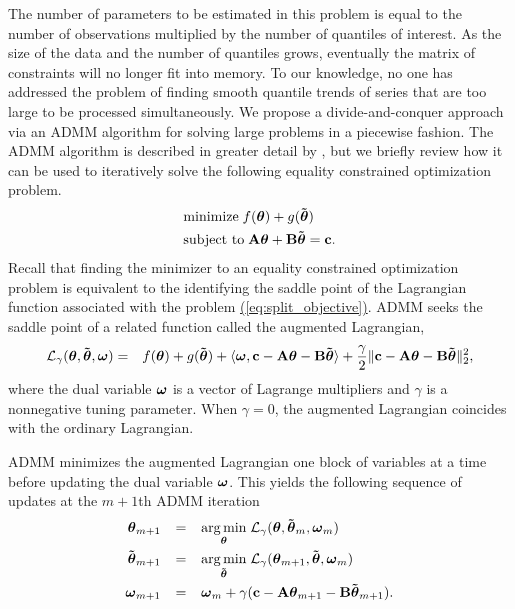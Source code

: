 \documentclass[12pt]{article}
\newcommand{\Eqn}[1]{\hyperref[eq:#1]{{\rm (\ref*{eq:#1})}}} %
\newcommand{\Eqn}[1]{{(\ref{eq:#1})}} %
\newcommand{\amp}{\mathop{\:\:\,}\nolimits}
\newcommand{\V}[1]{{\bm{\mathbf{\MakeLowercase{#1}}}}} %
\newcommand{\Vtilde}[1]{{\bm{\tilde \mathbf{\MakeLowercase{#1}}}}} %
\newcommand{\M}[1]{{\bm{\mathbf{\MakeUppercase{#1}}}}} %
\begin{document}
The number of parameters to be estimated in this problem is equal to the number of observations multiplied by the number of quantiles of interest. As the size of the data and the number of quantiles grows, eventually the matrix of constraints will no longer fit into memory. To our knowledge, no one has addressed the problem of finding smooth quantile trends of series that are too large to be processed simultaneously. We propose a divide-and-conquer approach via an ADMM algorithm for solving large problems in a piecewise fashion. The ADMM algorithm \citep{gabay1975dual, glowinski1975approximation} is  described in greater detail by \cite{boyd2011distributed}, but we briefly review how it can be used to iteratively solve the following equality constrained optimization problem.
\begin{equation}
\label{eq:split_objective}
\begin{split}
&\text{minimize} \; f(\V{\theta}) + g(\Vtilde{\theta}) \\
&\text{subject to} \; \M{A}\V{\theta} + \M{B}\Vtilde{\theta} = \V{c}.
\end{split}
\end{equation}
Recall that finding the minimizer to an equality constrained optimization problem is equivalent to the identifying the saddle point of the Lagrangian function associated with the problem \Eqn{split_objective}. ADMM seeks the saddle point of a related function called the augmented Lagrangian,
\begin{eqnarray*}
\mathcal{L}_{\gamma}(\V{\theta},\Vtilde{\theta},\V{\omega}) & = & f(\V{\theta}) + g(\Vtilde{\theta}) + \langle \V{\omega}, \V{c} - \M{A}\V{\theta} - \M{B}\Vtilde{\theta} \rangle
+ \frac{\gamma}{2} \lVert \V{c} - \M{A}\V{\theta} - \M{B}\Vtilde{\theta} \rVert_2^2,
\end{eqnarray*}
where the dual variable $\V{\omega}$ is a vector of Lagrange multipliers and $\gamma$ is a nonnegative tuning parameter. When $\gamma = 0$, the augmented Lagrangian coincides with the ordinary Lagrangian.

ADMM minimizes the augmented Lagrangian one block of variables at a time before updating the dual variable $\V{\omega}$. This yields the following sequence of updates at the $m+1$th ADMM iteration
\begin{equation}
\label{eq:admm_updates}
\begin{split}
\V{\theta}_{m+1} & \amp = \amp \underset{\V{\theta}}{\arg\min}\; \mathcal{L}_\gamma(\V{\theta},\Vtilde{\theta}_{m}, \V{\omega}_{m}) \\
\Vtilde{\theta}_{m+1} & \amp = \amp \underset{\Vtilde{\theta}}{\arg\min}\; \mathcal{L}_\gamma(\V{\theta}_{m+1},\Vtilde{\theta}, \V{\omega}_{m}) \\
\V{\omega}_{m+1} & \amp = \amp \V{\omega}_{m} + \gamma(\V{c} - \M{A}\V{\theta}_{m+1} - \M{B}\Vtilde{\theta}_{m+1}).
\end{split}
\end{equation}
	
\end{document}

